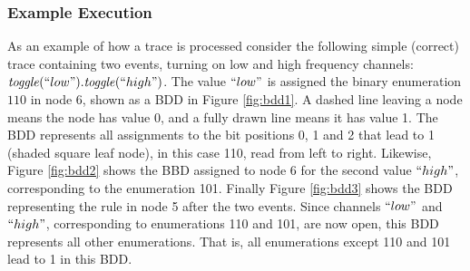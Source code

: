 \subsubsection{Example Execution}

As an example of how a trace is processed consider the following simple (correct) trace containing two events, turning on low and high frequency channels:
$\mathit{toggle}(``low").\mathit{toggle}(``high")$. The value $``low"$ is assigned the binary enumeration $110$ in node 6, shown 
as a BDD in Figure \ref{fig:bdd1}. A dashed line leaving a node means the node has value 0, and a fully drawn line means it has value 1. The BDD represents all assignments to the bit positions 0, 1 and 2 that lead to 1 (shaded square leaf node), in this case 110, read from left to right. Likewise, Figure \ref{fig:bdd2} shows the BBD assigned to node 6 for the second value $``high"$, corresponding to the enumeration 101. Finally Figure \ref{fig:bdd3} shows the BDD representing the rule  in node 5 after the two events. Since channels $``low"$ and $``high"$, corresponding to enumerations 110 and 101, are now open, this BDD represents all other enumerations. That is, all enumerations except 110 and 101 lead to 1 in this BDD.

